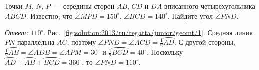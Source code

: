 \problem
Точки $M$, $N$, $P$~--- середины сторон $AB$, $CD$ и $DA$ вписанного
четырехугольника $ABCD$.
Известно, что $\angle MPD = 150^\circ$, $\angle BCD = 140^\circ$.
Найдите угол $\angle PND$. 

%
\label{solution:2013/ru/regatta/junior/geomt/1}%
\emph{Ответ:} $110^\circ$.
Рис.~\ref{fig:solution:2013/ru/regatta/junior/geomt/1}.
Средняя линия $PN$ параллельна $AC$, поэтому
$\angle PND = \angle ACD = \frac{1}{2} \wideparen{AD}$.
С другой стороны,
$\frac{1}{2} \wideparen{AB} = \angle ADB = \angle APM = 30^\circ$
и $\frac{1}{2} \wideparen{BCD} = 40^\circ$.
Поскольку
$\wideparen{AD} + \wideparen{AB} + \wideparen{BCD} = 360^\circ$,
то $\angle PND = 110^\circ$.
\endproblem
